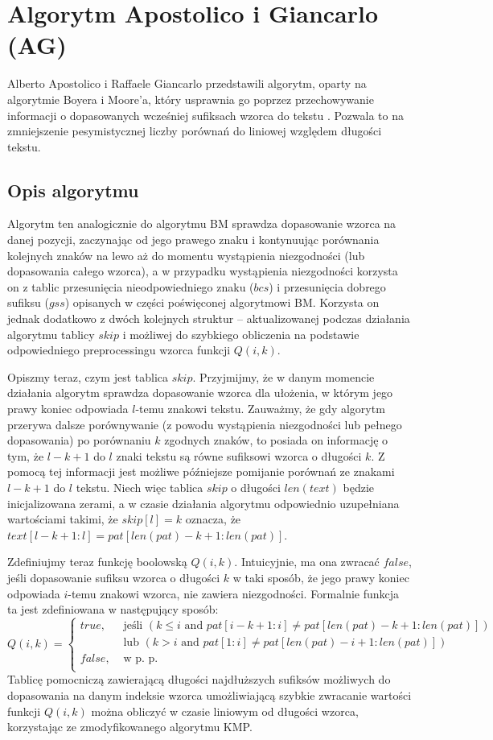 \newpage
\section{Algorytm Apostolico i Giancarlo (AG)}
Alberto Apostolico i Raffaele Giancarlo przedstawili algorytm, oparty na algorytmie Boyera i Moore’a, który usprawnia go poprzez przechowywanie informacji o dopasowanych wcześniej sufiksach wzorca do tekstu \cite{AG}. Pozwala to na zmniejszenie pesymistycznej liczby porównań do liniowej względem długości tekstu.

\subsection{Opis algorytmu}
Algorytm ten analogicznie do algorytmu BM sprawdza dopasowanie wzorca na danej pozycji, zaczynając od jego prawego znaku i kontynuując porównania kolejnych znaków na lewo aż do momentu wystąpienia niezgodności (lub dopasowania całego wzorca), a w przypadku wystąpienia niezgodności korzysta on z tablic przesunięcia nieodpowiedniego znaku ($bcs$) i przesunięcia dobrego sufiksu ($gss$) opisanych w części poświęconej algorytmowi BM. Korzysta on jednak dodatkowo z dwóch kolejnych struktur -- aktualizowanej podczas działania algorytmu tablicy $skip$ i możliwej do szybkiego obliczenia na podstawie odpowiedniego preprocessingu wzorca funkcji $Q(i,k)$.

Opiszmy teraz, czym jest tablica $skip$. Przyjmijmy, że w danym momencie działania algorytm sprawdza dopasowanie wzorca dla ułożenia, w którym jego prawy koniec odpowiada $l$-temu znakowi tekstu. Zauważmy, że gdy algorytm przerywa dalsze porównywanie (z powodu wystąpienia niezgodności lub pełnego dopasowania) po porównaniu $k$ zgodnych znaków, to posiada on informację o tym, że $l-k+1$ do $l$ znaki tekstu są równe sufiksowi wzorca o długości $k$. Z pomocą tej informacji jest możliwe późniejsze pomijanie porównań ze znakami $l-k+1$ do $l$ tekstu. Niech więc tablica $skip$ o długości $len(text)$ będzie inicjalizowana zerami, a w czasie działania algorytmu odpowiednio uzupełniana wartościami takimi, że $skip[l] = k$ oznacza, że $text[l-k+1:l]=pat[len(pat)-k+1:len(pat)]$.

Zdefiniujmy teraz funkcję boolowską $Q(i,k)$. Intuicyjnie, ma ona zwracać $false$, jeśli dopasowanie sufiksu wzorca o długości $k$ w taki sposób, że jego prawy koniec odpowiada $i$-temu znakowi wzorca, nie zawiera niezgodności. Formalnie funkcja ta jest zdefiniowana w następujący sposób:
\[
    Q(i,k)= 
    \begin{cases}
        true,& \text{ jeśli } (k \leq i \text{ and } pat[i-k+1:i] \neq pat[len(pat)-k+1:len(pat)])\\
        & \text{ lub } (k > i \text{ and } pat[1:i] \neq pat[len(pat)-i+1:len(pat)])\\
        false,& \text{ w p. p. }\\
    \end{cases}
\]
Tablicę pomocniczą zawierającą długości najdłuższych sufiksów możliwych do dopasowania na danym indeksie wzorca umożliwiającą szybkie zwracanie wartości funkcji $Q(i,k)$ można obliczyć w czasie liniowym od długości wzorca, korzystając ze zmodyfikowanego algorytmu KMP.

